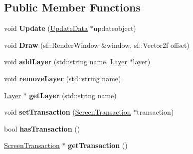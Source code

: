 \subsection*{Public Member Functions}
\begin{DoxyCompactItemize}
\item 
\hypertarget{class_game_screen_aa297aaa006484162d80fe2a5ea15f375}{void {\bfseries Update} (\hyperlink{class_update_data}{Update\-Data} $\ast$updateobject)}\label{class_game_screen_aa297aaa006484162d80fe2a5ea15f375}

\item 
\hypertarget{class_game_screen_afb11360ac509f47ca47929c254a8b67d}{void {\bfseries Draw} (sf\-::\-Render\-Window \&window, sf\-::\-Vector2f offset)}\label{class_game_screen_afb11360ac509f47ca47929c254a8b67d}

\item 
\hypertarget{class_game_screen_a14685a397e9c9c0ec971f648eeb1ec8b}{void {\bfseries add\-Layer} (std\-::string name, \hyperlink{class_layer}{Layer} $\ast$layer)}\label{class_game_screen_a14685a397e9c9c0ec971f648eeb1ec8b}

\item 
\hypertarget{class_game_screen_ace7d3aad324a781cd22599b56903fb43}{void {\bfseries remove\-Layer} (std\-::string name)}\label{class_game_screen_ace7d3aad324a781cd22599b56903fb43}

\item 
\hypertarget{class_game_screen_accd7cd68d80fc29593703ee1741b8996}{\hyperlink{class_layer}{Layer} $\ast$ {\bfseries get\-Layer} (std\-::string name)}\label{class_game_screen_accd7cd68d80fc29593703ee1741b8996}

\item 
\hypertarget{class_game_screen_a1c5d1420883ee7c135747c6aadf7fae9}{void {\bfseries set\-Transaction} (\hyperlink{class_screen_transaction}{Screen\-Transaction} $\ast$transaction)}\label{class_game_screen_a1c5d1420883ee7c135747c6aadf7fae9}

\item 
\hypertarget{class_game_screen_a5aadb0f4d885be777b3d99f08add9f88}{bool {\bfseries has\-Transaction} ()}\label{class_game_screen_a5aadb0f4d885be777b3d99f08add9f88}

\item 
\hypertarget{class_game_screen_ab148b3dc8dd0921eaf90e52fb61d7817}{\hyperlink{class_screen_transaction}{Screen\-Transaction} $\ast$ {\bfseries get\-Transaction} ()}\label{class_game_screen_ab148b3dc8dd0921eaf90e52fb61d7817}

\end{DoxyCompactItemize}
